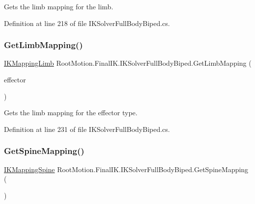 Gets the limb mapping for the limb. 



Definition at line 218 of file I\+K\+Solver\+Full\+Body\+Biped.\+cs.

\mbox{\label{class_root_motion_1_1_final_i_k_1_1_i_k_solver_full_body_biped_ae2ed6739b99204e848db21e42153e9d7}} 
\subsubsection{\texorpdfstring{Get\+Limb\+Mapping()}{GetLimbMapping()}\hspace{0.1cm}{\footnotesize\ttfamily [2/2]}}
{\footnotesize\ttfamily \mbox{\hyperlink{class_root_motion_1_1_final_i_k_1_1_i_k_mapping_limb}{I\+K\+Mapping\+Limb}} Root\+Motion.\+Final\+I\+K.\+I\+K\+Solver\+Full\+Body\+Biped.\+Get\+Limb\+Mapping (\begin{DoxyParamCaption}\item[{\mbox{\hyperlink{namespace_root_motion_1_1_final_i_k_ae0dd2058c7667b6f132c11a6b860c14a}{Full\+Body\+Biped\+Effector}}}]{effector }\end{DoxyParamCaption})}



Gets the limb mapping for the effector type. 



Definition at line 231 of file I\+K\+Solver\+Full\+Body\+Biped.\+cs.

\mbox{\label{class_root_motion_1_1_final_i_k_1_1_i_k_solver_full_body_biped_a9f9ed1a8e3f75029e096cf2602ea635e}} 
\subsubsection{\texorpdfstring{Get\+Spine\+Mapping()}{GetSpineMapping()}}
{\footnotesize\ttfamily \mbox{\hyperlink{class_root_motion_1_1_final_i_k_1_1_i_k_mapping_spine}{I\+K\+Mapping\+Spine}} Root\+Motion.\+Final\+I\+K.\+I\+K\+Solver\+Full\+Body\+Biped.\+Get\+Spine\+Mapping (\begin{DoxyParamCaption}{ }\end{DoxyParamCaption})}



